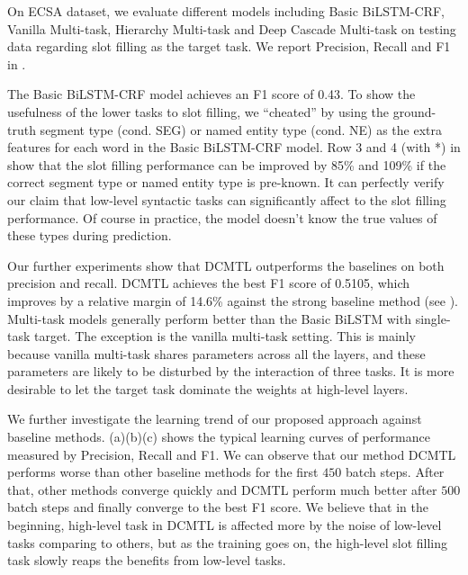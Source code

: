 On ECSA dataset,
we evaluate different models including 
Basic BiLSTM-CRF, Vanilla Multi-task, 
Hierarchy Multi-task and Deep Cascade Multi-task
on testing data regarding slot filling as the target task. %
We report Precision, Recall and F1 in .

The Basic BiLSTM-CRF model achieves an F1 score of 0.43.
To show the usefulness of the lower tasks to slot filling,
we ``cheated'' by using the ground-truth segment type (cond. SEG) or 
named entity type (cond. NE) as the extra features for each word
in the Basic BiLSTM-CRF model.
Row 3 and 4 (with *) in  show that the slot filling 
performance can be improved by 85\% and 109\% if the correct segment type
or named entity type is pre-known.
It can perfectly verify our claim that low-level syntactic tasks can significantly affect to the slot filling performance.
Of course in practice, the model doesn't know the true values of these types during prediction.

Our further experiments show that DCMTL outperforms the 
baselines on both precision and recall.
DCMTL achieves the best F1 score of 0.5105, 
which improves by a relative margin of 14.6\% 
against the strong baseline method (see ).
Multi-task models generally perform better than the Basic 
BiLSTM with single-task target.
The exception is the vanilla multi-task setting.
This is mainly because 
vanilla multi-task shares parameters across all the layers,
and these parameters are likely to be disturbed by the interaction of 
three tasks. It is more desirable to let the target task dominate the 
weights at high-level layers.

We further investigate the learning trend of our proposed approach against baseline methods.
(a)(b)(c) shows the typical learning curves 
of performance measured by Precision, Recall and F1.
We can observe that our method DCMTL 
performs worse than other baseline methods
for the first $450$ batch steps.
After that, other methods converge quickly 
and DCMTL perform much better after $500$ batch steps
and finally converge to the best F1 score.
We believe that in the beginning,
high-level task in DCMTL is affected more by the noise of low-level tasks comparing to others,
but as the training goes on,
the high-level slot filling task slowly reaps the benefits from low-level tasks.

